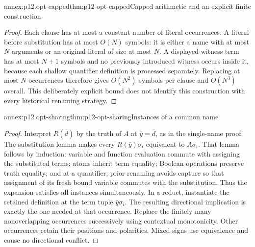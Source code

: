 \begin{annexitem}{annex:p12.opt-capped}{thm:p12-opt-capped}{Capped arithmetic and an explicit finite construction}
\begin{proof}
Each clause has at most a constant number of literal occurrences.
A literal before substitution has at most \(O(N)\) symbols:
it is either a name with at most \(N\) arguments or an original
literal of size at most \(N\). A displayed witness term has at
most \(N+1\) symbols and no previously introduced witness occurs
inside it, because each shallow quantifier definition is processed
separately. Replacing at most \(N\) occurrences therefore gives
\(O(N^2)\) symbols per clause and \(O(N^3)\) overall.
This deliberately explicit bound does not identify this construction
with every historical renaming strategy.
\end{proof}
\end{annexitem}

\begin{annexitem}{annex:p12.opt-sharing}{thm:p12-opt-sharing}{Instances of a common name}
\begin{proof}
Interpret \(R(\bar d)\) by the truth of \(A\) at \(\bar y=\bar d\),
as in the single-name proof. The substitution lemma makes every
\(R(\bar y)\sigma_i\) equivalent to \(A\sigma_i\).
That lemma follows by induction: variable and function evaluation
commute with assigning the substituted terms; atoms inherit term
equality; Boolean operations preserve truth equality; and at a
quantifier, prior renaming avoids capture so that assignment of
its fresh bound variable commutes with the substitution.
Thus the expansion satisfies all instances simultaneously.
In a reduct, instantiate the retained definition at the term tuple
\(\bar y\sigma_i\). The resulting directional implication is
exactly the one needed at that occurrence. Replace the finitely
many nonoverlapping occurrences successively using contextual
monotonicity. Other occurrences retain their positions and polarities.
Mixed signs use equivalence and cause no directional conflict.


\end{proof}
\end{annexitem}
